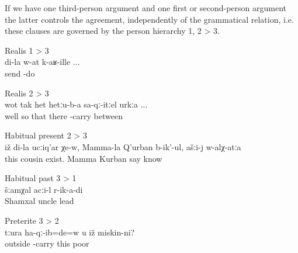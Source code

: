 If we have one third-person argument and one first or second-person argument the latter controls the agreement, independently of the grammatical relation, i.e. these clauses are governed by the person hierarchy 1, 2 > 3. 
%
\begin{exe}
	\ex	Realis  1 > 3\\	\label{ex:‎‎If (I) send my (brother) RC13}
	\gll	di-la	w-at	k-aʁ-ille ...\\
			send		-do\\
	\glt	{}

	\ex	Realis  2 > 3\\	\label{ex:‎‎‎like this, if (you) put this here, in the middle RC23}
	\gll	wot	tak	het	hetːu-b-a	sa-qː-itːel	urkːa ...\\
		well	so	that	there	-carry	between\\
	\glt	{}

	\ex	Habitual present 2 > 3\\	\label{ex:‎‎‎I have a cousin called Mamala Kurban, you know him HP 23}
	\gll	iž	di-la	ucːiq'ar	χe-w,	Mamma-la	Q'urban	b-ik'-ul,	ašːi-j	w-alχ-atːa\\
		this		cousin	exist.	Mamma	Kurban	say				know\\
	\glt	{}

	\ex	Habitual past 3 > 1\\	\label{ex:‎‎‎Uncle Shamkhal led me HB31}
	\gll	šːamχal	acːi-l	r-ik-a-di\\
		Shamxal	uncle	lead\\
	\glt	{}

	\ex	Preterite 3 > 2\\		\label{ex:Did the poor man pull you out PT32}
	\gll	tːura	ha-qː-ib=de=w	u	iž	miskin-ni?\\
		outside	-carry		this	poor\\
	\glt	{}
\end{exe}

